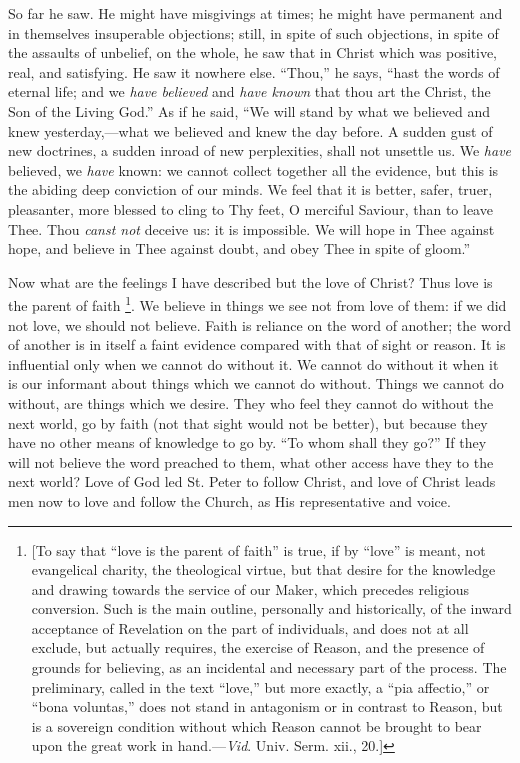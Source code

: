 So far he saw. He might have misgivings at times; he might have
permanent and in themselves insuperable objections; still, in spite of
such objections, in spite of the assaults of unbelief, on the whole,
he saw that in Christ which was positive, real, and satisfying. He saw
it nowhere else. ``Thou,'' he says, ``hast the words of
eternal life; and we \emph{have believed} and \emph{have known} that
thou art the Christ, the Son of the Living God.'' As if he said,
``We will stand by what we believed and knew yesterday,—what we
believed and knew the day before. A sudden gust of new doctrines, a
sudden inroad of new perplexities, shall not unsettle us. We \emph{have}
believed, we \emph{have} known: we cannot collect together all the
evidence, but this is the abiding deep conviction of our minds. We
feel that it is better, safer, truer, pleasanter, more blessed to
cling to Thy feet, O merciful Saviour, than to leave Thee. Thou \emph{canst
not} deceive us: it is impossible. We will hope in Thee against
hope, and believe in Thee against doubt, and obey Thee in spite of
gloom.''

Now what are the feelings I have described but the love of Christ?
Thus love is the parent of faith \footnote{[To say that ``love is the parent of
faith'' is true, if by ``love'' is meant, not evangelical
charity, the theological virtue, but that desire for the knowledge and
drawing towards the service of our Maker, which precedes religious
conversion. Such is the main outline, personally and historically, of
the inward acceptance of Revelation on the part of individuals, and
does not at all exclude, but actually requires, the exercise of
Reason, and the presence of grounds for believing, as an incidental
and necessary part of the process. The preliminary, called in the text
``love,'' but more exactly, a ``pia affectio,'' or
``bona voluntas,'' does not stand in antagonism or in contrast
to Reason, but is a sovereign condition without which Reason cannot be
brought to bear upon the great work in hand.—\emph{Vid}. Univ.
Serm. xii., 20.]}. We believe in things we see not from love of them: if we
did not love, we should not believe. Faith is reliance on the word of
another; the word of another is in itself a faint evidence compared
with that of sight or reason. It is influential only when we cannot do
without it. We cannot do without it when it is our informant about
things which we cannot do without. Things we cannot do without, are
things which we desire. They who feel they cannot do without the next
world, go by faith (not that sight would not be better), but because
they have no other means of knowledge to go by. ``To whom shall
they go?'' If they will not believe the word preached to them,
what other access have they to the next world? Love of God led St.
Peter to follow Christ, and love of Christ leads men now to love and
follow the Church, as His representative and voice.

